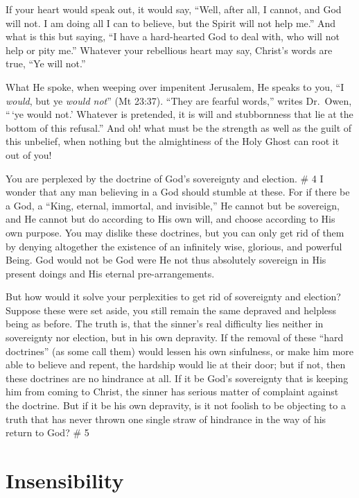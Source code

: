 \documentclass[
]{book}
\begin{document}
If your heart would speak out, it would say, ``Well, after all, I cannot, and God will not. I am doing all I can to believe, but the Spirit will not help me.'' And what is this but saying, ``I have a hard-hearted God to deal with, who will not help or pity me.'' Whatever your rebellious heart may say, Christ's words are true, ``Ye will not.''

What He spoke, when weeping over impenitent Jerusalem, He speaks to you, ``I \emph{would}, but ye \emph{would not}'' (Mt 23:37). ``They are fearful words,'' writes Dr.~Owen, ``\,`ye would not.' Whatever is pretended, it is will and stubbornness that lie at the bottom of this refusal.'' And oh! what must be the strength as well as the guilt of this unbelief, when nothing but the almightiness of the Holy Ghost can root it out of you!

You are perplexed by the doctrine of God's sovereignty and election.
\# 4
I wonder that any man believing in a God should stumble at these. For if there be a God, a ``King, eternal, immortal, and invisible,'' He cannot but be sovereign, and He cannot but do according to His own will, and choose according to His own purpose. You may dislike these doctrines, but you can only get rid of them by denying altogether the existence of an infinitely wise, glorious, and powerful Being. God would not be God were He not thus absolutely sovereign in His present doings and His eternal pre-arrangements.

But how would it solve your perplexities to get rid of sovereignty and election? Suppose these were set aside, you still remain the same depraved and helpless being as before. The truth is, that the sinner's real difficulty lies neither in sovereignty nor election, but in his own depravity. If the removal of these ``hard doctrines'' (as some call them) would lessen his own sinfulness, or make him more able to believe and repent, the hardship would lie at their door; but if not, then these doctrines are no hindrance at all. If it be God's sovereignty that is keeping him from coming to Christ, the sinner has serious matter of complaint against the doctrine. But if it be his own depravity, is it not foolish to be objecting to a truth that has never thrown one single straw of hindrance in the way of his return to God?
\# 5

\hypertarget{insensibility}{%
\chapter{Insensibility}\label{insensibility}}
\end{document}
